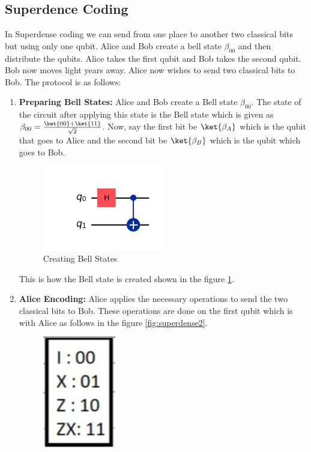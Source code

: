 \documentclass[12pt, oneside]{book}
\theoremstyle{definition}
\theoremstyle{definition}
\theoremstyle{remark}
\begin{document}
\subsection{Superdence Coding}
In Superdense coding we can send from one place to another two classical bits but using only one qubit. 
Alice and Bob create a bell state $\beta_{00}$ and then distribute the qubits. Alice takes the first qubit and Bob takes the second qubit.
Bob now moves light years away. Alice now wishes to send two classical bits to Bob. The protocol is as follows:
\begin{enumerate}
    \item \textbf{Preparing Bell States: }Alice and Bob create a Bell state $\beta_{00}$.
    The state of the circuit after applying this state is the Bell state which is given as $\beta_{00}=\frac{\ket{00}+\ket{11}}{\sqrt{2}}$.
    Now, say the first bit be $\ket{\beta_A}$ which is the qubit that goes to Alice and the second bit be $\ket{\beta_B}$ which is the qubit which goes to Bob.
    \begin{figure}[H]
        \centering
        \includegraphics[width=0.5\textwidth]{../images/superdense-coding1.png}
        \caption{Creating Bell States}
        \label{fig:superdense1}
    \end{figure}
    This is how the Bell state is created shown in the figure \ref{fig:superdense1}.
    \item \textbf{Alice Encoding: } Alice applies the necessary operations to send the two classical bits to Bob.
    These operations are done on the first qubit which is with Alice as follows in the figure \ref{fig:superdense2}.
    \begin{figure}[H]
        \centering
        \includegraphics[width=0.3\textwidth]{../images/superdense-coding2.png}

\end{figure}
\end{enumerate}
\end{document}
